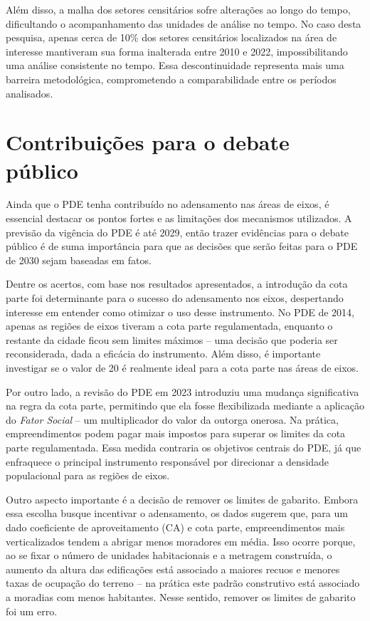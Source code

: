 Além disso, a malha dos setores censitários sofre alterações ao longo do tempo, dificultando o acompanhamento das unidades de análise no tempo. No caso desta pesquisa, apenas cerca de 10\% dos setores censitários localizados na área de interesse mantiveram sua forma inalterada entre 2010 e 2022, impossibilitando uma análise consistente no tempo. Essa descontinuidade representa mais uma barreira metodológica, comprometendo a comparabilidade entre os períodos analisados.



\clearpage

\section{Contribuições para o debate público}
\label{sec:contribuicoes}

Ainda que o PDE tenha contribuído no adensamento nas áreas de eixos, é essencial destacar os pontos fortes e as limitações dos mecanismos utilizados. A previsão da vigência do PDE é até 2029, então trazer evidências para o debate público é de suma importância para que as decisões que serão feitas para o PDE de 2030 sejam baseadas em fatos.

Dentre os acertos, com base nos resultados apresentados, a introdução da cota parte foi determinante para o sucesso do adensamento nos eixos, despertando interesse em entender como otimizar o uso desse instrumento. No PDE de 2014, apenas as regiões de eixos tiveram a cota parte regulamentada, enquanto o restante da cidade ficou sem limites máximos -- uma decisão que poderia ser reconsiderada, dada a eficácia do instrumento. Além disso, é importante investigar se o valor de 20 é realmente ideal para a cota parte nas áreas de eixos. 

Por outro lado, a revisão do PDE em 2023 introduziu uma mudança significativa na regra da cota parte, permitindo que ela fosse flexibilizada mediante a aplicação do \textit{Fator Social} -- um multiplicador do valor da outorga onerosa. Na prática, empreendimentos podem pagar mais impostos para superar os limites da cota parte regulamentada. Essa medida contraria os objetivos centrais do PDE, já que enfraquece o principal instrumento responsável por direcionar a densidade populacional para as regiões de eixos.

Outro aspecto importante é a decisão de remover os limites de gabarito. Embora essa escolha busque incentivar o adensamento, os dados sugerem que, para um dado coeficiente de aproveitamento (CA) e cota parte, empreendimentos mais verticalizados tendem a abrigar menos moradores em média. Isso ocorre porque, ao se fixar o número de unidades habitacionais e a metragem construída, o aumento da altura das edificações está associado a maiores recuos e menores taxas de ocupação do terreno -- na prática este padrão construtivo está associado a moradias com menos habitantes. Nesse sentido, remover os limites de gabarito foi um erro.

